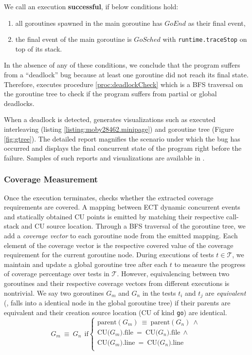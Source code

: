 We call an execution \textbf{successful}, if below conditions hold:
\begin{enumerate}
  \item all goroutines spawned in the main goroutine has $GoEnd$ as their final event,
  \item the final event of the main goroutine is $GoSched$ with \texttt{runtime.traceStop} on top of its stack.
\end{enumerate}

In the absence of any of these conditions, we conclude that the program suffers from a ``deadlock'' bug because at least one goroutine did not reach its final state.
%
Therefore, \goat executes procedure \ref{proc:deadlockCheck} which is a BFS traversal on the goroutine tree to check if the program suffers from partial or global deadlocks.





When a deadlock is detected, \goat generates visualizations such as executed interleaving (listing \ref{listing:moby28462.minipage}) and goroutine tree (Figure \ref{fig:gtree}).
%
The detailed report magnifies the scenario under which the bug has occurred and displays the final concurrent state of the program right before the failure.
%
Samples of such reports and visualizations are available in \cite{iiswc_goat_visualizations}.



\subsubsection{Coverage Measurement}
Once the execution terminates, \goat checks whether the extracted coverage requirements are covered.
%
A mapping between ECT dynamic concurrent events and statically obtained CU points is emitted by matching their respective call-stack and CU source location.
%
Through a BFS traversal of the goroutine tree, we add a \textit{coverage vector} to each goroutine node from the emitted mapping.
%
Each element of the coverage vector is the respective covered value of the coverage requirement for the current goroutine node.
%
During executions of tests $t \in \mathcal{T}$, we maintain and update a global goroutine tree after each $t$ to measure the progress of coverage percentage over tests in $\mathcal{T}$.
%
However, equivalencing between two goroutines and their respective coverage vectors from different executions is nontrivial.
%
We say two goroutines $G_m$ and $G_n$ in the tests $t_i$ and $t_j$ are \textit{equivalent} (\ie, falls into a identical node in the global goroutine tree) if their parents are equivalent and their creation source location (CU of kind \texttt{go}) are identical.
%
\begin{equation}
  G_m~\equiv~G_n~~\text{if}
  \begin{cases}
    \text{parent}(G_m)~\equiv~\text{parent}(G_n)~\wedge \\
    \text{CU(}G_m\text{).file}~=~\text{CU(}G_n\text{).file}~\wedge\\
    \text{CU(}G_m\text{).line}~=~\text{CU(}G_n\text{).line}~\\
  \end{cases}
\end{equation}
